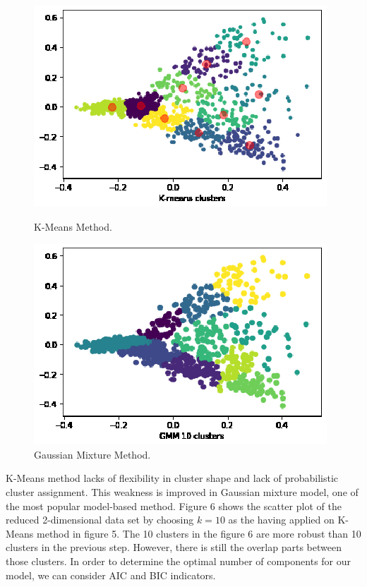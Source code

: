 \documentclass[12pt]{article}
\begin{document}
\begin{figure}[!t]
  \centering
  \begin{minipage}[b]{0.45\textwidth}
    \includegraphics[width=1\columnwidth]{6_kmeans_2dim.eps}
    \caption{ K-Means Method.}
  \end{minipage}
  \hfill
  \begin{minipage}[b]{0.45\textwidth}
    \includegraphics[width=1\columnwidth]{7_gmm_2dim.eps}
    \caption{Gaussian Mixture Method.\label{gmm}}
  \end{minipage}
\end{figure}
K-Means method lacks of flexibility in cluster shape and lack of probabilistic cluster assignment. This weakness is improved in Gaussian mixture model, one of the most popular model-based method. Figure 6 shows the scatter plot of the reduced 2-dimensional data set by choosing $k = 10$ as the having applied on K-Means method in figure 5. The 10 clusters in the figure 6 are  more robust than 10 clusters in the previous step. However, there is still the overlap parts between those clusters. In order to determine the optimal number of components for our model, we can consider AIC and BIC indicators.
\end{document}
